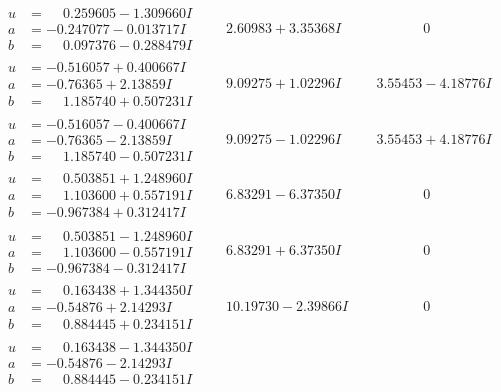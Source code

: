 \documentclass[1p]{elsarticle_modified}
\theoremstyle{definition}
\begin{document}
$$\begin{array}{c|c|c}
\begin{aligned}
u &= \phantom{-}0.259605 - 1.309660 I \\
a &= -0.247077 - 0.013717 I \\
b &= \phantom{-}0.097376 - 0.288479 I\end{aligned}
 & \phantom{-}2.60983 + 3.35368 I & \phantom{-0.000000 } 0 \\ \hline\begin{aligned}
u &= -0.516057 + 0.400667 I \\
a &= -0.76365 + 2.13859 I \\
b &= \phantom{-}1.185740 + 0.507231 I\end{aligned}
 & \phantom{-}9.09275 + 1.02296 I & \phantom{-}3.55453 - 4.18776 I \\ \hline\begin{aligned}
u &= -0.516057 - 0.400667 I \\
a &= -0.76365 - 2.13859 I \\
b &= \phantom{-}1.185740 - 0.507231 I\end{aligned}
 & \phantom{-}9.09275 - 1.02296 I & \phantom{-}3.55453 + 4.18776 I \\ \hline\begin{aligned}
u &= \phantom{-}0.503851 + 1.248960 I \\
a &= \phantom{-}1.103600 + 0.557191 I \\
b &= -0.967384 + 0.312417 I\end{aligned}
 & \phantom{-}6.83291 - 6.37350 I & \phantom{-0.000000 } 0 \\ \hline\begin{aligned}
u &= \phantom{-}0.503851 - 1.248960 I \\
a &= \phantom{-}1.103600 - 0.557191 I \\
b &= -0.967384 - 0.312417 I\end{aligned}
 & \phantom{-}6.83291 + 6.37350 I & \phantom{-0.000000 } 0 \\ \hline\begin{aligned}
u &= \phantom{-}0.163438 + 1.344350 I \\
a &= -0.54876 + 2.14293 I \\
b &= \phantom{-}0.884445 + 0.234151 I\end{aligned}
 & \phantom{-}10.19730 - 2.39866 I & \phantom{-0.000000 } 0 \\ \hline\begin{aligned}
u &= \phantom{-}0.163438 - 1.344350 I \\
a &= -0.54876 - 2.14293 I \\
b &= \phantom{-}0.884445 - 0.234151 I\end{aligned}

\end{array}$$
\end{document}
